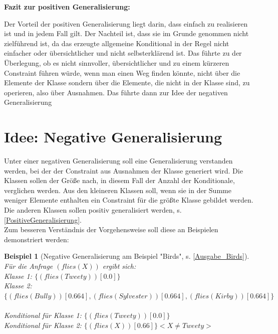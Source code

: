\documentclass[a4paper, 11pt]{book}
\newtheorem{Bsp}{Beispiel}[section]
\begin{document}
\textbf{{\large Fazit zur positiven Generalisierung:}}\label{Fazit pos Gen} 
\noindent

Der Vorteil der positiven Generalisierung liegt darin, dass einfach zu realisieren ist und in jedem Fall gilt. Der Nachteil ist, dass sie im Grunde genommen nicht zielführend ist, da das erzeugte allgemeine Konditional in der Regel nicht einfacher oder übersichtlicher und nicht selbsterklärend ist. Das führte zu der Überlegung, ob es nicht sinnvoller, übersichtlicher und zu einem kürzeren Constraint führen würde, wenn man einen Weg finden könnte, nicht über die Elemente der Klasse sondern über die Elemente, die nicht in der Klasse sind, zu operieren,  also über Ausnahmen. Das führte dann zur Idee der negativen Generalisierung 

\section{Idee: Negative Generalisierung}
\label{NegativeGeneralisierung}
Unter einer negativen Generalisierung soll eine Generalisierung verstanden werden, bei der der Constraint aus Ausnahmen der Klasse generiert wird. Die Klassen sollen der Größe nach, in diesem Fall der Anzahl der Konditionale, verglichen werden. Aus den kleineren Klassen soll, wenn sie in der Summe weniger Elemente enthalten ein Constraint für die größte Klasse gebildet werden. Die anderen Klassen sollen positiv generalisiert werden, s. \ref{PositiveGeneralisierung}.\\
Zum besseren Verständnis der Vorgehensweise soll diese an Beispielen demonstriert werden:
\begin{Bsp}[Negative Generalisierung am Beispiel "{}Birds"{}, s. \ref{Ausgabe_Birds}]
	\label{Bsp:Neg_Gen_Birds} Für die Anfrage $ (flies(X)) $ ergibt sich: \\
	
	\noindent
	Klasse 1: $\{(flies(Tweety))[0.0]\}$\\
	Klasse 2: $\{(flies(Bully))[0.664], (flies(Sylvester))[0.664], (flies(Kirby))[0.664]\}$\\
	\\
Konditional für Klasse 1: $\{(flies(Tweety))[0.0]\}$\\
Konditional für Klasse 2: $\{(flies(X))[0.66]\} <X \neq Tweety>$\\
\end{Bsp}
 
\end{document}
